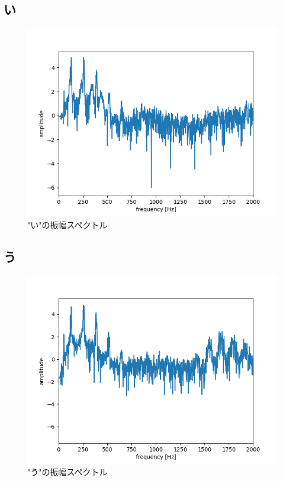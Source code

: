 \documentclass[a4paper,11pt]{jsarticle}
\begin{document}
\subsection*{い}
\begin{figure}[H]
  \centering
  \includegraphics[scale=0.5]{../ex02/img/plot-spectrum-2000_i.png}
  \caption{"い"の振幅スペクトル}
  \label{spectrum_i}
\end{figure}

\subsection*{う}
\begin{figure}[H]
  \centering
  \includegraphics[scale=0.5]{../ex02/img/plot-spectrum-2000_u.png}
  \caption{"う"の振幅スペクトル}
  \label{spectrum_u}
\end{figure}
\end{document}

